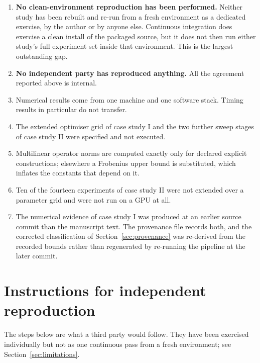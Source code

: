 \documentclass[11pt]{amsart}
\theoremstyle{remark}
\begin{document}
\begin{enumerate}[leftmargin=*]
\item \textbf{No clean-environment reproduction has been performed.} Neither study has been
rebuilt and re-run from a fresh environment as a dedicated exercise, by the author or by
anyone else. Continuous integration does exercise a clean install of the packaged source,
but it does not then run either study's full experiment set inside that environment. This
is the largest outstanding gap.
\item \textbf{No independent party has reproduced anything.} All the agreement reported
above is internal.
\item Numerical results come from one machine and one software stack. Timing results in
particular do not transfer.
\item The extended optimiser grid of case study I and the two further sweep stages of case
study II were specified and not executed.
\item Multilinear operator norms are computed exactly only for declared explicit
constructions; elsewhere a Frobenius upper bound is substituted, which inflates the
constants that depend on it.
\item Ten of the fourteen experiments of case study II were not extended over a parameter
grid and were not run on a GPU at all.
\item The numerical evidence of case study I was produced at an earlier source commit than
the manuscript text. The provenance file records both, and the corrected classification of
Section~\ref{sec:provenance} was re-derived from the recorded bounds rather than
regenerated by re-running the pipeline at the later commit.
\end{enumerate}

\section{Instructions for independent reproduction}
\label{sec:instructions}

The steps below are what a third party would follow. They have been exercised individually
but not as one continuous pass from a fresh environment; see Section~\ref{sec:limitations}.
\end{document}
